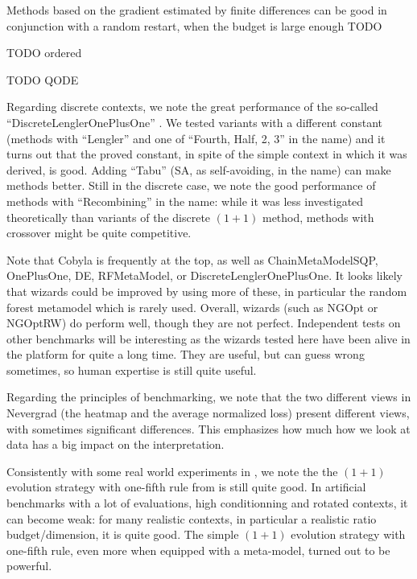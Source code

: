 Methods based on the gradient estimated by finite differences can be good in conjunction with a random restart, when the
budget is large enough TODO

TODO ordered

TODO QODE


Regarding discrete contexts, we note the great performance of the so-called ``DiscreteLenglerOnePlusOne''
\cite{lengler}. We tested variants with a different constant (methods with ``Lengler'' and one of ``Fourth, Half, 2, 3''
in the name) and it turns out that the proved constant, in spite of the simple context in which it was derived, is good.
Adding ``Tabu'' (SA, as self-avoiding, in the name) can make methods better.
Still in the discrete case, we note the good performance of methods with ``Recombining'' in the name: while it was less
investigated theoretically than variants of the discrete $(1+1)$ method, methods with crossover might be quite
competitive.

Note that Cobyla is frequently at the top, as well as ChainMetaModelSQP, OnePlusOne, DE, RFMetaModel, or DiscreteLenglerOnePlusOne.
It looks likely that wizards could be improved by using more of these, in particular the random forest metamodel which
is rarely used.
Overall, wizards (such as NGOpt or NGOptRW) do perform well, though they are not perfect. Independent tests on other
benchmarks will be interesting as the wizards tested here have been alive in the platform for quite a long time. They
are useful, but can guess wrong sometimes, so human expertise is still quite useful.

Regarding the principles of benchmarking, we note that the two different views in Nevergrad (the heatmap and the average
normalized loss) present different views, with sometimes significant differences. This emphasizes how much how we look at data has a big impact on the interpretation.

%
%
%
%

Consistently with some real world experiments in \cite{micropredictions1,micropredictions2}, we note the the $(1+1)$ evolution strategy with one-fifth rule from \cite{rechenberg73} is still quite good. In artificial benchmarks with a lot of evaluations, high conditionning and rotated contexts, it can become weak: for many realistic contexts, in particular a realistic ratio budget/dimension, it is quite good.
The simple $(1+1)$ evolution strategy with one-fifth rule, even more when equipped with a meta-model, turned out to be powerful.

